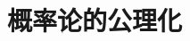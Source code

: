 \documentclass[12pt,letterpaper,twoside,openright]{ctexbook}
\theoremstyle{bluehead}
\theoremstyle{olivehead}
\theoremstyle{orangehead}
\theoremstyle{redremark}
\begin{document}
\setcounter{page}{3}
\tableofcontents

\chapter{概率论的公理化}



% 
% 
% 
\end{document}

